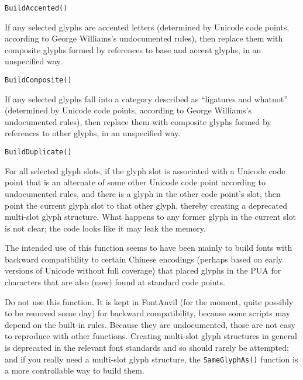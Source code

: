 

\texttt{BuildAccented()}

If any selected glyphs are accented letters (determined by Unicode code
points, according to George Williams's undocumented rules), then replace
them with composite glyphs formed by references to base and accent glyphs,
in an unspecified way.



\texttt{BuildComposite()}

If any selected glyphs fall into a category described as ``ligatures and
whatnot'' (determined by Unicode code points, according to George Williams's
undocumented rules), then replace them with composite glyphs formed by
references to other glyphs, in an unspecified way.



\texttt{BuildDuplicate()}

For all selected glyph slots, if the glyph slot is associated with a Unicode
code point that is an alternate of some other Unicode code point according
to undocumented rules, and there is a glyph in the other code point's slot,
then point the current glyph slot to that other glyph, thereby creating a
deprecated multi-slot glyph structure.  What happens to any former glyph in
the current slot is not clear; the code looks like it may leak the memory.

The intended use of this function seems to have been mainly to build
fonts with backward compatibility to certain Chinese encodings (perhaps
based on early versions of Unicode without full coverage) that placed glyphs
in the PUA for characters that are also (now) found at standard code points.

Do not use this function.  It is kept in FontAnvil (for the moment, quite
possibly to be removed some day) for backward compatibility, because some
scripts may depend on the built-in rules.  Because they are undocumented,
those are not easy to reproduce with other functions.  Creating multi-slot
glyph structures in general is deprecated in the relevant font standards and
so should rarely be attempted; and if you really need a multi-slot glyph
structure, the \texttt{SameGlyphAs()} function is a more controllable way to
build them.

